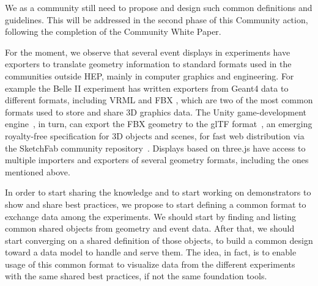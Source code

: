 \documentclass[12pt,a4paper]{article}
\begin{document}

We as a community still need to propose and design such common definitions and guidelines. This will
be addressed in the second phase of this Community action, following the completion of the Community White Paper.

For the moment, we observe that several event displays in experiments have exporters to translate geometry information to standard
formats used in the communities outside HEP, mainly in computer graphics and engineering. For example the Belle II experiment has
written exporters from Geant4 data to different formats, including VRML and FBX \cite{BelleIIGeoExporters}, which are two of the most
common formats used to store and share 3D graphics data. The Unity game-development engine~\cite{Unity3D}, in turn, can export the
FBX geometry to the glTF format~\cite{glTF}, an emerging royalty-free specification for 3D objects and scenes, for fast web distribution
via the SketchFab community repository~\cite{SketchFabBelleII,SketchFab}. Displays based on three.js have access to multiple importers and exporters
of several geometry formats, including the ones mentioned above. %

In order to start sharing the knowledge and to start working on demonstrators to show and share best practices, we propose to start
defining a common format to exchange data among the experiments. We should start by finding and listing common shared objects from
geometry and event data. After that, we should start converging on a shared definition of those objects, to build a common design
toward a data model to handle and serve them. The idea, in fact, is to enable usage of this common format to visualize data from
the different experiments with the same shared best practices, if not the same foundation tools.
\end{document}
